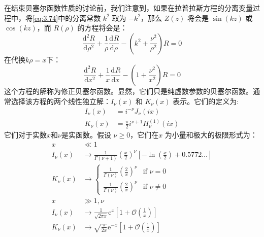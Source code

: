 \documentclass[lang=cn,10pt,newtx,bibend=biber,device=pad]{elegantbook}
\newcommand{\deri}[3]{\dfrac{\mathrm{d}^{#1}#2}{\mathrm{d}#3^{#1}}}%
\begin{document}
在结束贝塞尔函数性质的讨论前，我们注意到，如果在拉普拉斯方程的分离变量过程中，将\ref{eq:3.74}中的分离常数 $k^2$ 取为 $-k^2$，那么 $Z(z)$ 将会是 $\sin(kz)$ 或 $\cos (kz)$，而 $R(\rho)$ 的方程将会是：
\begin{equation}
    \deri{2}{R}{\rho}+\frac{1}{\rho}\deri{}{R}{\rho}-\left(k^2+\frac{\nu^2}{\rho^2}\right)R=0
\end{equation}\label{eq:3.98}
在代换$k\rho = x$下：
\begin{equation}\label{eq:3.99}
    \deri{2}{R}{x}+\frac{1}{x}\deri{}{R}{x}-\left(1+\frac{\nu^2}{x^2}\right)R=0
\end{equation}
这个方程的解称为修正贝塞尔函数。显然，它们只是纯虚数参数的贝塞尔函数。通常选择该方程的两个线性独立解：$I_\nu(x)$ 和 $K_\nu(x)$ 表示。它们的定义为:
\begin{equation}\label{eq:3.100}
    \begin{aligned}
    I_\nu(x) &= i^{-\nu} J_\nu(ix) \\
    K_\nu(x) &= \frac{\pi}{2} i^{\nu+1} H_\nu^{(1)}(ix)
    \end{aligned}
\end{equation}
它们对于实数$x$和$\nu$是实函数。假设 $\nu \geq 0$，它们在$x$ 为小量和极大的极限形式为：
\begin{align}
    x &\ll 1 \\
    I_\nu(x) &\to \frac{1}{\Gamma(\nu + 1)}\left(\frac{x}{2}\right)^\nu \left[-\ln\left(\frac{x}{2}\right) + 0.5772 \dots\right] \\
    K_\nu(x) &\to \left\{\begin{array}{ll}
    \frac{1}{\Gamma(\nu)}\left(\frac{2}{x}\right)^\nu & \text{if } \nu = 0 \\
    \frac{1}{\Gamma(\nu)}\left(\frac{2}{x}\right)^\nu & \text{if } \nu \neq 0
    \end{array}\right. \\
    x &\gg 1, \nu \\
    I_\nu(x) &\to \frac{1}{\sqrt{2\pi x}}\mathrm{e}^{x}\left[1 + \mathcal{O}\left(\frac{1}{x}\right)\right] \\
    K_\nu(x) &\to \sqrt{\frac{\pi}{2x}}\mathrm{e}^{-x}\left[1 + \mathcal{O}\left(\frac{1}{x}\right)\right]
\end{align}
\end{document}
